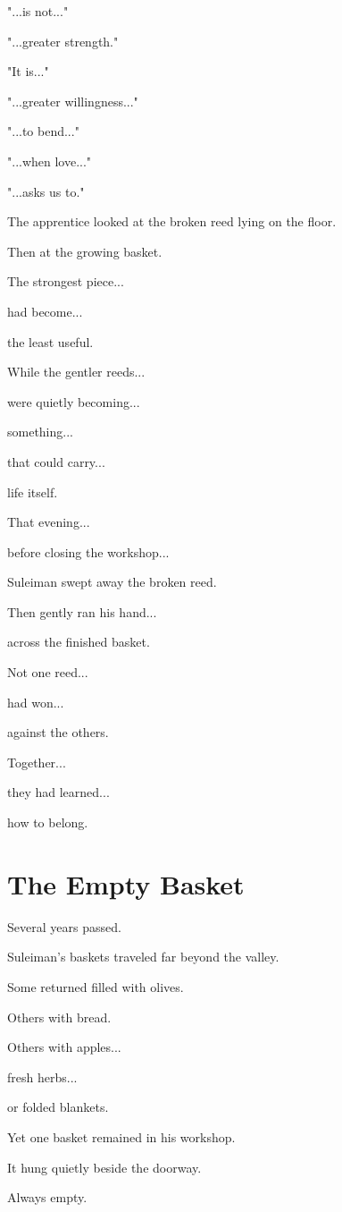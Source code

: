 \documentclass[12pt,openany]{book}
\begin{document}
"...is not..."

"...greater strength."

"It is..."

"...greater willingness..."

"...to bend..."

"...when love..."

"...asks us to."

The apprentice looked at the broken reed lying on the floor.

Then at the growing basket.

The strongest piece...

had become...

the least useful.

While the gentler reeds...

were quietly becoming...

something...

that could carry...

life itself.

That evening...

before closing the workshop...

Suleiman swept away the broken reed.

Then gently ran his hand...

across the finished basket.

Not one reed...

had won...

against the others.

Together...

they had learned...

how to belong.
\section*{The Empty Basket}

Several years passed.

Suleiman's baskets traveled far beyond the valley.

Some returned filled with olives.

Others with bread.

Others with apples...

fresh herbs...

or folded blankets.

Yet one basket remained in his workshop.

It hung quietly beside the doorway.

Always empty.
\end{document}
